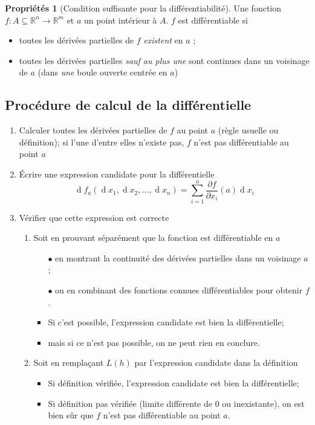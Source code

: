 \documentclass[11pt,a4paper]{article}
\theoremstyle{definition}
\newtheorem{myprop}[mydef]{Propriétés}
\DeclareMathOperator{\diff}{d}
\newcommand{\dif}{\diff\!}
\newcommand{\R}{\mathbb{R}}
\begin{document}
\begin{myprop}[Condition suffisante pour la différentiabilité] Une fonction $f : A \subseteq \R^n \to \R^m$ et $a$ un point intérieur à $A$. $f$ est différentiable si
	\begin{itemize}
		\item toutes les dérivées partielles de $f$ \emph{existent} en $a$ ;
		\item toutes les dérivées partielles \emph{sauf au plus une} sont continues dans un voisinage de $a$ (dans \emph{une} boule ouverte centrée en $a$)
	\end{itemize}
\end{myprop}

\subsection{Procédure de calcul de la différentielle}
\begin{enumerate}
	\item Calculer toutes les dérivées partielles de $f$ au point $a$ (règle usuelle ou définition);
		si l'une d'entre elles n'existe pas, $f$ n'est pas différentiable au point $a$
	\item Écrire une expression candidate pour la différentielle
		\[ \dif f_a(\dif x_1, \dif x_2, \dots, \dif x_n) = \sum_{i = 1}^n \frac{\partial f}{\partial x_i}(a) \dif x_i \]
	\item Vérifier que cette expression est correcte
		\begin{enumerate}
			\item Soit en prouvant séparément que la fonction est différentiable en $a$
				\begin{itemize}
					\item[$\bullet$] en montrant la continuité des dérivées partielles dans un voisinage $a$;
					\item[$\bullet$] ou en combinant des fonctions connues différentiables pour obtenir $f$.
				\end{itemize}
				\begin{itemize}
					\item Si c'est possible, l'expression candidate est bien la différentielle;
					\item mais si ce n'est pas possible, on ne peut rien en conclure.
				\end{itemize}
			\item Soit en remplaçant $L(h)$ par l'expression candidate dans la définition
				\begin{itemize}
					\item Si définition vérifiée, l'expression candidate est bien la différentielle;
					\item Si définition pas vérifiée (limite différente de 0 ou inexistante),
						on est bien sûr que $f$ n'est pas différentiable au point $a$.
				\end{itemize}
		\end{enumerate}
\end{enumerate}
\end{document}
